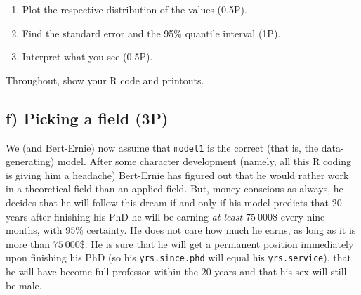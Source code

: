\documentclass[
]{article}
\providecommand{\tightlist}{%
  \setlength{\itemsep}{0pt}\setlength{\parskip}{0pt}}
\begin{document}
\begin{enumerate}
\def\labelenumi{(\roman{enumi})}
\setcounter{enumi}{1}
\tightlist
\item
  Plot the respective distribution of the values (0.5P).
\item
  Find the standard error and the 95\% quantile interval (1P).
\item
  Interpret what you see (0.5P).
\end{enumerate}

Throughout, show your R code and printouts.

\hypertarget{f-picking-a-field-3p}{%
\subsection{f) Picking a field (3P)}\label{f-picking-a-field-3p}}

We (and Bert-Ernie) now assume that \texttt{model1} is the correct (that
is, the data-generating) model. After some character development
(namely, all this R coding is giving him a headache) Bert-Ernie has
figured out that he would rather work in a theoretical field than an
applied field. But, money-conscious as always, he decides that he will
follow this dream if and only if his model predicts that \(20\) years
after finishing his PhD he will be earning \emph{at least} \(75\ 000\)\$
every nine months, with \(95\%\) certainty. He does not care how much he
earns, as long as it is more than \(75\ 000\)\$. He is sure that he will
get a permanent position immediately upon finishing his PhD (so his
\texttt{yrs.since.phd} will equal his \texttt{yrs.service}), that he
will have become full professor within the \(20\) years and that his sex
will still be male.
\end{document}
